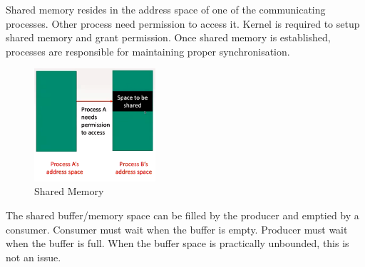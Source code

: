 \documentclass[a4paper]{article}
\theoremstyle{plain}
\theoremstyle{definition}
\newtheorem{defn}{Definition}[section]
\theoremstyle{remark}
\begin{document}
\begin{tcolorbox}[colback=black!3!white,colframe=black!60!white,title=\begin{defn}Shared Memory \label{Shared Memory}\end{defn}]
Shared memory resides in the address space of one of the communicating processes. Other process need permission to access it. Kernel is required to setup shared memory and grant permission. Once shared memory is established, processes are responsible for maintaining proper synchronisation.
\begin{figure}[H]
	\centering
	\includegraphics[width=0.4\textwidth]{eleven.png}
	\caption{Shared Memory}
	\label{fig:eleven-png}
\end{figure}
\end{tcolorbox}
\begin{tcolorbox}[colback=black!3!white,colframe=black!60!white,title=\begin{defn}Producer-Consumer Paradigm \label{Producer-Consumer Paradogim}\end{defn}]
The shared buffer/memory space can be filled by the producer and emptied by a consumer. Consumer must wait when the buffer is empty. Producer must wait when the buffer is full. When the buffer space is practically unbounded, this is not an issue.
\end{tcolorbox}
\end{document}
